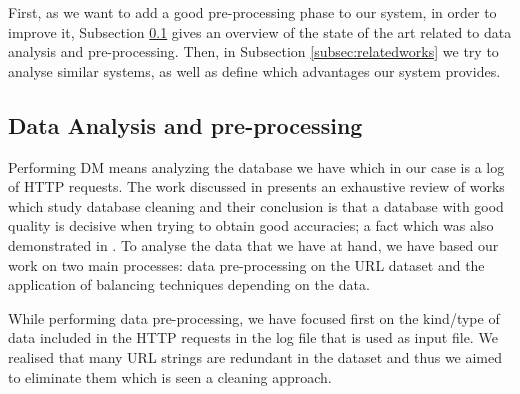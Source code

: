 \documentclass{llncs}
\begin{document}
First, as we want to add a good pre-processing phase to our system, in order to improve it, Subsection \ref{subsec:dataanalysis} gives an overview of the state of the art related to data analysis and pre-processing. Then, in Subsection \ref{subsec:relatedworks} we try to analyse similar systems, as well as define which advantages our system provides.

\subsection{Data Analysis and pre-processing}
\label{subsec:dataanalysis}

Performing DM means analyzing the database we have \cite{Frank2011}
which in our case is a log of HTTP requests. The work discussed in \cite{wilson2001maintaining} presents an exhaustive review of works which study database cleaning and their conclusion is that a database with good quality is decisive when trying to obtain good accuracies; a fact which was also demonstrated in \cite{zeineb2014thesis}. To analyse the data that we have at hand, we have based our work on two main processes: data pre-processing on the URL dataset and the application of balancing techniques depending on the data.

While performing data pre-processing, we have focused first on the kind/type of data included in the HTTP requests in the log file that is used as input file. We realised  that many URL strings are redundant in the dataset and thus we aimed  to eliminate them which is seen a cleaning approach.
  

\end{document}
